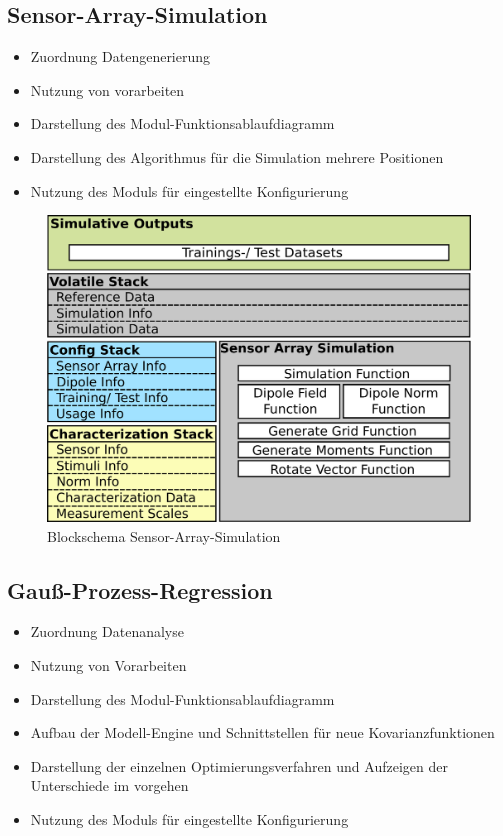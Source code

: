 \subsection{Sensor-Array-Simulation}\label{sub:sensor-array-av}
	\begin{itemize}
		\item Zuordnung Datengenerierung
		\item Nutzung von vorarbeiten
		\item Darstellung des Modul-Funktionsablaufdiagramm
		\item Darstellung des Algorithmus für die Simulation mehrere Positionen
		\item Nutzung des Moduls für eingestellte Konfigurierung
	\end{itemize}

\begin{figure}[tbph]
	\centering
	\includegraphics[width=0.7\linewidth]{chapters/images/3-SW-E-OExp/Blockschema_Sensor-Array}
	\caption[Blockschema Sensor-Array-Simulation]{Blockschema Sensor-Array-Simulation}
	\label{fig:blockschemasensor-array}
\end{figure}


\clearpage


\subsection{Gauß-Prozess-Regression}\label{sub:gpr-av}
	\begin{itemize}
		\item Zuordnung Datenanalyse
		\item Nutzung von Vorarbeiten
		\item Darstellung des Modul-Funktionsablaufdiagramm
		\item Aufbau der Modell-Engine und Schnittstellen für neue Kovarianzfunktionen
		\item Darstellung der einzelnen Optimierungsverfahren und Aufzeigen der Unterschiede im vorgehen
 		\item Nutzung des Moduls für eingestellte Konfigurierung
	\end{itemize}


